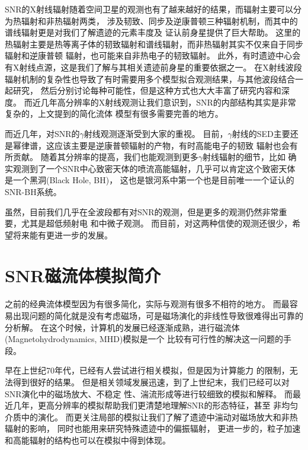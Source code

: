 SNR的X射线辐射随着空间卫星的观测也有了越来越好的结果，而辐射主要可以分为热辐射和非热辐射两类，
涉及韧致、同步及逆康普顿三种辐射机制，而其中的谱线辐射更是对我们了解遗迹的元素丰度及
证认前身星提供了巨大帮助。
这里的热辐射主要是热等离子体的韧致辐射和谱线辐射，而非热辐射其实不仅来自于同步辐射和逆康普顿
辐射，也可能来自非热电子的韧致辐射。
此外，有时遗迹中心会有X射线点源，这是我们了解与其相关遗迹前身星的重要依据之一。
在X射线波段辐射机制的复杂性也导致了有时需要用多个模型拟合观测结果，与其他波段结合一起研究，
然后分别讨论每种可能性，但是这种方式也大大丰富了研究内容和深度。
而近几年高分辨率的X射线观测让我们意识到，SNR的内部结构其实是非常复杂的，上文提到的简化流体
模型有很多需要完善的地方。

而近几年，对SNR的$\gamma$射线观测逐渐受到大家的重视。
目前，$\gamma$射线的SED主要还是幂律谱，这应该主要是逆康普顿辐射的产物，有时高能电子的韧致
辐射也会有所贡献。
随着其分辨率的提高，我们也能观测到更多$\gamma$射线辐射的细节，比如\citet{Abeysekara2018}
确实观测到了一个SNR中心致密天体的喷流高能辐射，几乎可以肯定这个致密天体是一个黑洞(Black Hole, BH)，
这也是银河系中第一个也是目前唯一一个证认的SNR-BH系统。

虽然，目前我们几乎在全波段都有对SNR的观测，但是更多的观测仍然非常重要，尤其是超低频射电
和中微子观测。
而目前，对这两种信使的观测还很少，希望将来能有更进一步的发展。

\section{SNR磁流体模拟简介}
\label{MHDintro}
之前的经典流体模型因为有很多简化，实际与观测有很多不相符的地方。
而最容易出现问题的简化就是没有考虑磁场，可是磁场演化的非线性导致很难得出可靠的分析解。
在这个时候，计算机的发展已经逐渐成熟，进行磁流体(Magnetohydrodynamics, MHD)模拟是一个
比较有可行性的解决这一问题的手段。

早在上世纪70年代，已经有人尝试进行相关模拟\citep{1978MmSAI..49..513S}，但是因为计算能力
的限制，无法得到很好的结果。
但是相关领域发展迅速，到了上世纪末，我们已经可以对SNR演化中的磁场放大、不稳定
性、湍流形成等进行较细致的模拟和解释\citep{Jun1996, Jun1996a, Jun1999}。
而最近几年，更高分辨率的模拟帮助我们更清楚地理解SNR的形态特征\citep{Orlando2007}，甚至
非均匀介质中的演化\citep{Ferreira2008}。
而更关注局部的模拟让我们了解了遗迹中湍动对磁场放大和非热辐射的影响\citep{Fang2014, Ji2016}，
同时也能用来研究特殊遗迹中的偏振辐射\citep{Schneiter2015, Velazquez2017}，
更进一步的，粒子加速和高能辐射的结构也可以在模拟中得到体现\citep{Yang2015, vanMarle2018}。


